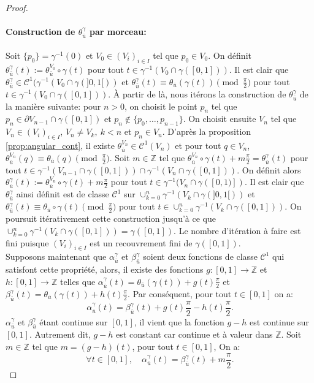 \begin{proof}
    \paragraph{Construction de $\theta_{\bar{u}}^\gamma$ par morceau:} Soit $\{p_0\}=\gamma^{-1}(0)$ et $V_0\in(V_i)_{i\in I}$ tel que $p_0\in V_0$. On définit $\theta_{\bar{u}}^\gamma(t):=\theta_{\bar{u}}^{V_0}\circ\gamma(t)$ pour tout $t\in\gamma^{-1}(V_0\cap\gamma([0, 1]))$. Il est clair que $\theta_{\bar{u}}^\gamma\in\mathcal{C}^1(\gamma^{-1}(V_0\cap\gamma(]0, 1[))$ et $\theta_{\bar{u}}^\gamma(t)\equiv\theta_{\bar{u}}(\gamma(t))\pmod{\frac{\pi}{2}}$ pour tout $t\in\gamma^{-1}(V_0\cap\gamma([0, 1]))$. À partir de là, nous itérons la construction de $\theta^\gamma_{\bar{u}}$ de la manière suivante: pour $n>0$, on choisit le point $p_n$ tel que $p_n\in\partial V_{n-1}\cap\gamma([0, 1])$ et $p_n\notin\{p_0,\dots,p_{n-1}\}$. On choisit ensuite $V_n$ tel que $V_n\in(V_i)_{i\in I}$, $V_n\neq V_k,~k<n$ et $p_n\in V_n$. D'après la proposition \ref{prop:angular_cont}, il existe $\theta_{\bar{u}}^{V_n}\in\mathcal{C}^1(V_n)$ et pour tout $q\in V_n$, $\theta_{\bar{u}}^{V_n}(q)\equiv\theta_{\bar{u}}(q)\pmod{\frac{\pi}{2}}$. Soit $m\in\mathbb{Z}$ tel que $\theta^{V_n}_{\bar{u}}\circ\gamma(t)+m\frac{\pi}{2}=\theta^\gamma_{\bar{u}}(t)$ pour tout $t\in\gamma^{-1}(V_{n-1}\cap\gamma([0, 1]))\cap\gamma^{-1}(V_n\cap\gamma([0, 1]))$. On définit alors $\theta_{\bar{u}}^\gamma(t):=\theta^{V_n}_{\bar{u}}\circ\gamma(t)+m\frac{\pi}{2}$ pour tout $t\in\gamma^{-1}(V_n\cap\gamma([0, 1)])$. Il est clair que $\theta_{\bar{u}}^\gamma$ ainsi définit est de classe $\mathcal{C}^1$ sur $\cup_{k=0}^n\gamma^{-1}(V_k\cap\gamma(]0, 1[))$ et $\theta_{\bar{u}}^\gamma(t)\equiv\theta_{\bar{u}}\circ\gamma(t)\pmod{\frac{\pi}{2}}$ pour tout $t\in\cup_{k=0}^n\gamma^{-1}(V_k\cap\gamma([0, 1]))$. On poursuit itérativement cette construction jusqu'à ce que $\cup_{k=0}^n\gamma^{-1}(V_k\cap\gamma([0, 1]))=\gamma([0, 1])$. Le nombre d'itération à faire est fini puisque $(V_i)_{i\in I}$ est un recouvrement fini de $\gamma([0, 1])$.
    \[\]
    Supposons maintenant que $\alpha_{\bar{u}}^\gamma$ et $\beta_{\bar{u}}^\gamma$ soient deux fonctions de classe $\mathcal{C}^1$ qui satisfont cette propriété, alors, il existe des fonctions $g:[0, 1]\longrightarrow\mathbb{Z}$ et $h:[0, 1]\longrightarrow\mathbb{Z}$ telles que $\alpha^\gamma_{\bar{u}}(t) = \theta_{\bar{u}}(\gamma(t)) + g(t)\frac{\pi}{2}$ et $\beta^\gamma_{\bar{u}}(t) =\theta_{\bar{u}}(\gamma(t)) + h(t)\frac{\pi}{2}$. Par conséquent, pour tout $t\in[0, 1]$ on a:
    $$\alpha_{\bar{u}}^\gamma(t) = \beta_{\bar{u}}^\gamma(t) + g(t)\frac{\pi}{2}-h(t)\frac{\pi}{2}.$$
    $\alpha^\gamma_{\bar{u}}$ et $\beta^\gamma_{\bar{u}}$ étant continue sur $[0, 1]$, il vient que la fonction $g-h$ est continue sur $[0, 1]$. Autrement dit, $g-h$ est constant car continue et à valeur dans $\mathbb{Z}$. Soit $m\in\mathbb{Z}$ tel que $m=(g-h)(t)$, pour tout $t\in[0, 1]$, On a:
    $$\forall t\in[0, 1],\quad\alpha_{\bar{u}}^\gamma(t) = \beta_{\bar{u}}^\gamma(t) + m\frac{\pi}{2}.$$
\end{proof}

